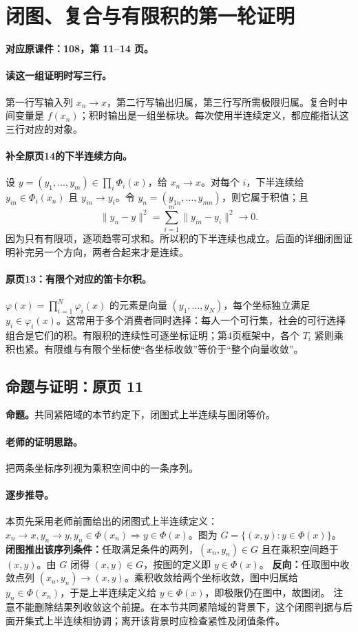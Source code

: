 \documentclass[11pt,a4paper]{article}
\theoremstyle{definition}\newtheorem{definition}{定义}\newtheorem{example}{例}
\begin{document}
\clearpage\section{闭图、复合与有限积的第一轮证明}\label{g:108:11}

\textbf{对应原课件：108，第 11--14 页。}


\paragraph{读这一组证明时写三行。}
第一行写输入列 $x_n\to x$，第二行写输出归属，第三行写所需极限归属。复合时中间变量是 $f(x_n)$；积时输出是一组坐标块。每次使用半连续定义，都应能指认这三行对应的对象。
\paragraph{补全原页14的下半连续方向。}
设 $y=(y_1,\ldots,y_m)\in\prod_i\Phi_i(x)$，给 $x_n\to x$。对每个 $i$，下半连续给 $y_{in}\in\Phi_i(x_n)$ 且 $y_{in}\to y_i$。令 $y_n=(y_{1n},\ldots,y_{mn})$，则它属于积值；且
\[\|y_n-y\|^2=\sum_{i=1}^m\|y_{in}-y_i\|^2\longrightarrow0.\]
因为只有有限项，逐项趋零可求和。所以积的下半连续也成立。后面的详细闭图证明补完另一个方向，两者合起来才是连续。


\paragraph{原页13：有限个对应的笛卡尔积。}$\varphi(x)=\prod_{i=1}^N\varphi_i(x)$ 的元素是向量 $(y_1,\ldots,y_N)$，每个坐标独立满足 $y_i\in\varphi_i(x)$。这常用于多个消费者同时选择：每人一个可行集，社会的可行选择组合是它们的积。有限积的连续性可逐坐标证明；第4页框架中，各个 $T_i$ 紧则乘积也紧。有限维与有限个坐标使“各坐标收敛”等价于“整个向量收敛”。



\subsection{命题与证明：原页 11}

\textbf{命题。}共同紧陪域的本节约定下，闭图式上半连续与图闭等价。

\paragraph{老师的证明思路。}把两条坐标序列视为乘积空间中的一条序列。

\paragraph{逐步推导。}本页先采用老师前面给出的闭图式上半连续定义：$x_n\to x,y_n\to y,y_n\in\Phi(x_n)\Rightarrow y\in\Phi(x)$。图为 $G=\{(x,y):y\in\Phi(x)\}$。
\textbf{闭图推出该序列条件：}任取满足条件的两列，$(x_n,y_n)\in G$ 且在乘积空间趋于 $(x,y)$。由 $G$ 闭得 $(x,y)\in G$，按图的定义即 $y\in\Phi(x)$。
\textbf{反向：}任取图中收敛点列 $(x_n,y_n)\to(x,y)$。乘积收敛给两个坐标收敛，图中归属给 $y_n\in\Phi(x_n)$，于是上半连续定义给 $y\in\Phi(x)$，即极限仍在图中，故图闭。
注意不能删除结果列收敛这个前提。在本节共同紧陪域的背景下，这个闭图判据与后面开集式上半连续相协调；离开该背景时应检查紧性及闭值条件。
\end{document}
